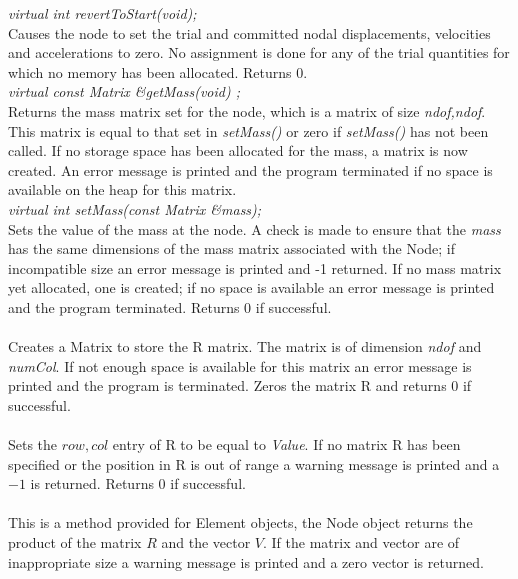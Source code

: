 {\em virtual int revertToStart(void);} \\
Causes the node to set the trial and committed nodal displacements,
velocities and accelerations to zero. No assignment is done for any of
the trial quantities for which no memory has been allocated. Returns $0$.\\


{\em virtual const Matrix \&getMass(void) ;}\\
Returns the mass matrix set for the node, which is a matrix of size
{\em ndof,ndof}. This matrix is equal to that set in {\em setMass()}
or zero if {\em setMass()} has not been called. If no storage space
has been allocated for the mass, a matrix is now created. An error
message is printed and the program terminated if no space is available
on the heap for this matrix.\\

{\em virtual int setMass(const Matrix \&mass);} \\
Sets the value of the mass at the node. A check is made to ensure that
the {\em mass} has the same dimensions of the mass matrix associated with the
Node; if incompatible size an error message is printed and -1 returned. If no
mass matrix yet allocated, one is created; if no space is available an
error message is printed and the program terminated. Returns 0 if successful. \\

 \\
Creates a Matrix to store the R matrix. The matrix is of dimension
{\em ndof} and {\em numCol}. If not enough space is available for this
matrix an error message is printed and the program is terminated. Zeros the
matrix R and returns $0$ if successful. \\

 \\
Sets the {\em \(row,col\)} entry of R to be equal to {\em Value}. If
no matrix R has been specified or the position in R is out of range a
warning message is printed and a $-1$ is returned. Returns $0$ if
successful. \\


 \\
This is a method provided for Element objects, the Node object returns
the product of the matrix $R$ and the vector $V$. If the matrix 
and vector are of inappropriate size a warning message is printed and
a zero vector is returned. \\

